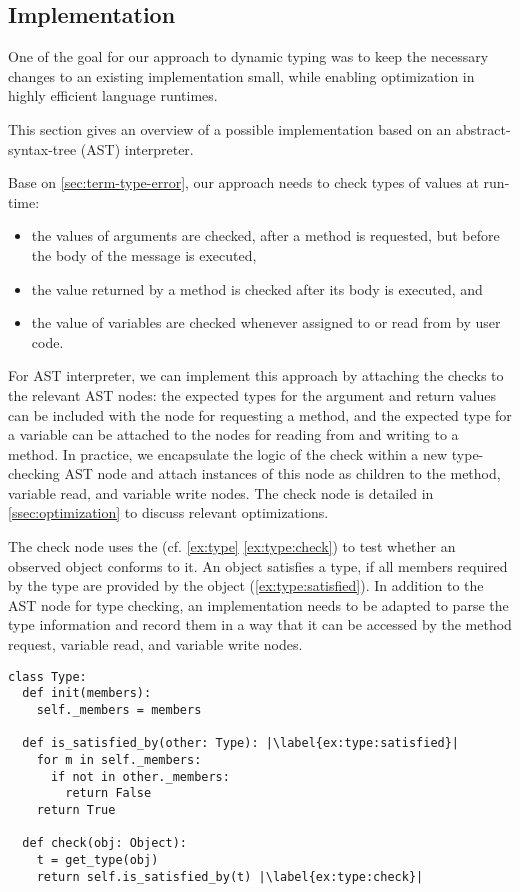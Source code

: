 \subsection{Implementation} 
\label{ssec:implementation} 

One of the goal for our approach to dynamic typing was to keep
the necessary changes to an existing implementation small,
while enabling optimization in highly efficient language runtimes.

This section gives an overview of a possible implementation
based on an abstract-syntax-tree (AST) interpreter.

Base on \cref{sec:term-type-error},
our approach needs to check types of values at run-time:

\begin{itemize}
\item the values of arguments are checked, after a method is requested, 
      but before the body of the message is executed,
\item the value returned by a method is checked after its body is executed, and
\item the value of variables are checked
      whenever assigned to or read from by user code.
\end{itemize}

For AST interpreter,
we can implement this approach by attaching the checks to the relevant AST nodes:
the expected types for the argument and return values can be included
with the node for requesting a method, and the expected type for a variable
can be attached to the nodes for reading from and writing to a method.
In practice,
we encapsulate the logic of the check within a new type-checking AST node
and attach instances of this node as children to the method,
variable read, and variable write nodes. 
The check node is detailed in \cref{ssec:optimization} to discuss relevant
optimizations.

The check node uses the  (cf. \cref{ex:type} \cref{ex:type:check}) to test whether an observed
object conforms to it.
An object satisfies a type, if all members required by the type are provided
by the object (\cref{ex:type:satisfied}).
In addition to the AST node for type checking,
an implementation needs to be adapted to parse the type information
and record them in a way that it can be accessed by the
method request, variable read, and variable write nodes.


\begin{lstlisting}[label={ex:type},escapechar=|,caption={Sketch of a \code{Type} in our system and its \code{check()} semantics.},float,floatplacement=htb]
class Type:
  def init(members):
    self._members = members

  def is_satisfied_by(other: Type): |\label{ex:type:satisfied}|
    for m in self._members:
      if not in other._members:
        return False
    return True

  def check(obj: Object):
    t = get_type(obj)
    return self.is_satisfied_by(t) |\label{ex:type:check}|
\end{lstlisting}



